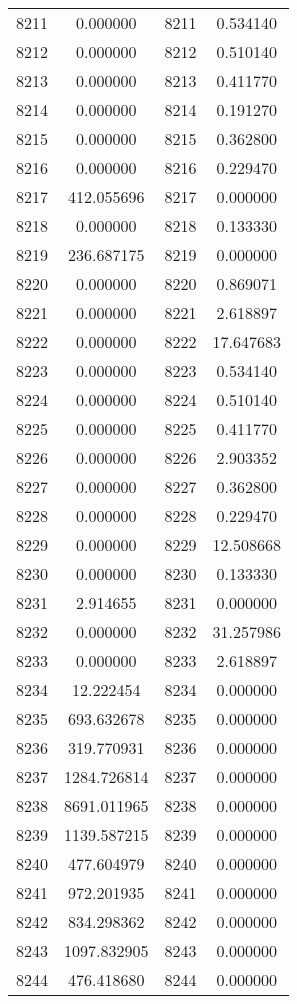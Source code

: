\documentclass[12pt]{article}
\begin{document}
\begin{longtable}{@{}cccc@{}}
8211 & 0.000000 & 8211 & 0.534140 \\
8212 & 0.000000 & 8212 & 0.510140 \\
8213 & 0.000000 & 8213 & 0.411770 \\
8214 & 0.000000 & 8214 & 0.191270 \\
8215 & 0.000000 & 8215 & 0.362800 \\
8216 & 0.000000 & 8216 & 0.229470 \\
8217 & 412.055696 & 8217 & 0.000000 \\
8218 & 0.000000 & 8218 & 0.133330 \\
8219 & 236.687175 & 8219 & 0.000000 \\
8220 & 0.000000 & 8220 & 0.869071 \\
8221 & 0.000000 & 8221 & 2.618897 \\
8222 & 0.000000 & 8222 & 17.647683 \\
8223 & 0.000000 & 8223 & 0.534140 \\
8224 & 0.000000 & 8224 & 0.510140 \\
8225 & 0.000000 & 8225 & 0.411770 \\
8226 & 0.000000 & 8226 & 2.903352 \\
8227 & 0.000000 & 8227 & 0.362800 \\
8228 & 0.000000 & 8228 & 0.229470 \\
8229 & 0.000000 & 8229 & 12.508668 \\
8230 & 0.000000 & 8230 & 0.133330 \\
8231 & 2.914655 & 8231 & 0.000000 \\
8232 & 0.000000 & 8232 & 31.257986 \\
8233 & 0.000000 & 8233 & 2.618897 \\
8234 & 12.222454 & 8234 & 0.000000 \\
8235 & 693.632678 & 8235 & 0.000000 \\
8236 & 319.770931 & 8236 & 0.000000 \\
8237 & 1284.726814 & 8237 & 0.000000 \\
8238 & 8691.011965 & 8238 & 0.000000 \\
8239 & 1139.587215 & 8239 & 0.000000 \\
8240 & 477.604979 & 8240 & 0.000000 \\
8241 & 972.201935 & 8241 & 0.000000 \\
8242 & 834.298362 & 8242 & 0.000000 \\
8243 & 1097.832905 & 8243 & 0.000000 \\
8244 & 476.418680 & 8244 & 0.000000 \\

\end{longtable}
\end{document}

